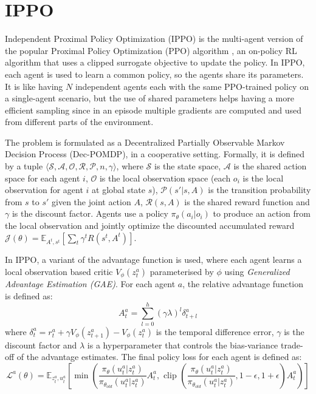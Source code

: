 \section{IPPO}

Independent Proximal Policy Optimization (IPPO) is the multi-agent version of the popular Proximal Policy Optimization (PPO) algorithm \cite{schulman2017ppo}, 
an on-policy RL algorithm that uses a clipped surrogate objective to update the policy. In IPPO, each agent is used to learn a common policy, so the agents share
its parameters. It is like having $N$ independent agents each with the same PPO-trained policy on a single-agent scenario,
but the use of shared parameters helps having a more efficient sampling since in an episode multiple gradients are computed and used from different parts of the environment.

The problem is formulated as a Decentralized Partially Observable Markov Decision Process (Dec-POMDP), in a cooperative setting. Formally, it is defined by a tuple $\langle \mathcal{S},
\mathcal{A},\mathcal{O},\mathcal{R},\mathcal{P},n,\gamma\rangle$, where $\mathcal{S}$ is the state space, $\mathcal{A}$ is the shared action space for each agent $i$, $\mathcal{O}$ is the 
local observation space (each $o_i$ is the local observation for agent $i$ at global state $s$), $\mathcal{P}(s'|s,A)$ is the transition probability from $s$ to $s'$ given the joint action 
$A$, $\mathcal{R}(s,A)$ is the shared reward function and $\gamma$ is the discount factor. 
Agents use a policy $\pi_{\theta}(a_i|o_i)$ to produce an action from the local observation and jointly optimize the discounted accumulated reward $\mathcal{J}(\theta) = \mathbb{E}_{A^t,s^t}\left[\sum_t\gamma^t R(s^t,A^t)\right]$.

In IPPO, a variant of the advantage function is used, where each agent learns a local observation based critic $V_{\phi}(z^a_t)$ parameterised by $\phi$ using \textit{Generalized Advantage Estimation (GAE)}. For each agent
$a$, the relative advantage function is defined as:
\begin{equation}
    A^a_t = \sum_{l=0}^{h}(\gamma\lambda)^l\delta^a_{t+l}
\end{equation}
where $\delta^a_t = r^a_t + \gamma V_{\phi}(z^a_{t+1}) - V_{\phi}(z^a_t)$ is the temporal difference error, $\gamma$ is the discount factor and $\lambda$ is a hyperparameter that controls the bias-variance trade-off of the advantage estimates.
The final policy loss for each agent is defined as:
\begin{equation}
    \mathcal{L}^a(\theta) = \mathbb{E}_{z^a_t,u^a_t}\left[\min\left(\frac{\pi_{\theta}(u^a_t|z^a_t)}{\pi_{\theta_{old}}(u^a_t|z^a_t)}A^a_t,\text{ clip }\left(\frac{\pi_{\theta}(u^a_t|z^a_t)}{\pi_{\theta_{old}}(u^a_t|z^a_t)},1-\epsilon,1+\epsilon\right)A^a_t\right)\right]
\end{equation}

